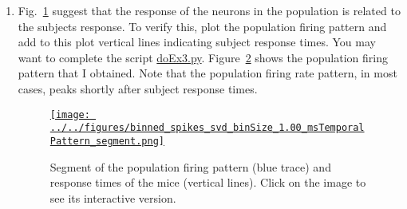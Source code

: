 \documentclass[12pt]{article}
\begin{document}
\begin{enumerate}
            \begin{figure}
                \begin{center}
                    \href{https://www.gatsby.ucl.ac.uk/~rapela/statNeuro/2025/worksheets/04_dimensionalityReduction/figures/binned_spikes_svd_binSize_1.00_u0Sorted.html}{\texttt{[image: ../../figures/binned\_spikes\_svd\_binSize\_1.00\_u0Sorted.png]}}
                    \caption{Z-scores of binned spikes times of all neurons.
                    Neurons have been sorted according to the similarity of
                    their firing pattern to the population firing pattern in
                    Fig.~\ref{fig:populationFiringPattern}. Click on the image to
                    see its interactive version.}
                \end{center}
                \label{fig:ex2}
            \end{figure}

        \item Fig.~\ref{fig:ex2} suggest that the response of the neurons in
            the population is related to the subjects response. To verify this,
            plot the population firing pattern and add to this plot vertical lines
            indicating subject response times. You may want to complete the
            script
            \href{https://github.com/joacorapela/statNeuro2025/blob/master/worksheets/04_dimensionalityReduction/doEx3.py}{doEx3.py}.
            Figure~\ref{fig:populationFiringPattern} shows the population firing
            pattern that I obtained. Note that the population firing rate
            pattern, in most cases, peaks shortly after subject response times.

            \begin{figure}
                \begin{center}
                    \href{https://www.gatsby.ucl.ac.uk/~rapela/statNeuro/2025/worksheets/04_dimensionalityReduction/figures/binned_spikes_svd_binSize_1.00_msTemporalPattern.html}{\texttt{[image: ../../figures/binned\_spikes\_svd\_binSize\_1.00\_msTemporalPattern\_segment.png]}}
                    \caption{Segment of the population firing pattern (blue
                    trace) and response times of the mice (vertical
                    lines). Click on the image to see its interactive version.}
                \end{center}
                \label{fig:populationFiringPattern}
            \end{figure}


\end{enumerate}
\end{document}
